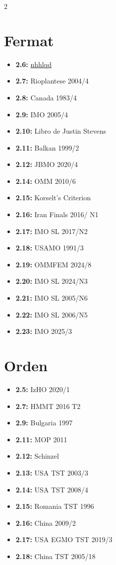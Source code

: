 \documentclass[11pt]{scrartcl}
\begin{document}
\begin{multicols}{2}
\section{Fermat}
\begin{itemize}
    \item \textbf{2.6: } \href{https://artofproblemsolving.com/community/c6t32742f6h2232770_find_all_p_n_satisfy_conditions}{nhhlqd}
    \item \textbf{2.7: } Rioplantese 2004/4
    \item \textbf{2.8: } Canada 1983/4 
    \item \textbf{2.9: } IMO 2005/4
    \item \textbf{2.10: } Libro de Justin Stevens 
    \item \textbf{2.11: } Balkan 1999/2
    \item \textbf{2.12: } JBMO 2020/4
    \item \textbf{2.14: } OMM 2010/6
    \item \textbf{2.15: } Korselt's Criterion 
    \item \textbf{2.16: } Iran Finals 2016/ N1 
    \item \textbf{2.17: } IMO SL 2017/N2 
    \item \textbf{2.18: } USAMO 1991/3
    \item \textbf{2.19: } OMMFEM 2024/8
    \item \textbf{2.20: } IMO SL 2024/N3 
    \item \textbf{2.21: } IMO SL 2005/N6 
    \item \textbf{2.22: } IMO SL 2006/N5
    \item \textbf{2.23: } IMO 2025/3
\end{itemize}
\columnbreak
\section{Orden}
\begin{itemize}
    \item \textbf{2.5: } IzHO 2020/1
    \item \textbf{2.7: } HMMT 2016 T2 
    \item \textbf{2.9: } Bulgaria 1997
    \item \textbf{2.11: } MOP 2011
    \item \textbf{2.12: } Schinzel 
    \item \textbf{2.13: } USA TST 2003/3
    \item \textbf{2.14: } USA TST 2008/4 
    \item \textbf{2.15: } Romania TST 1996
    \item \textbf{2.16: } China 2009/2 
    \item \textbf{2.17: } USA EGMO TST 2019/3
    \item \textbf{2.18: } China TST 2005/18    
\end{itemize}
\end{multicols}
\end{document}
